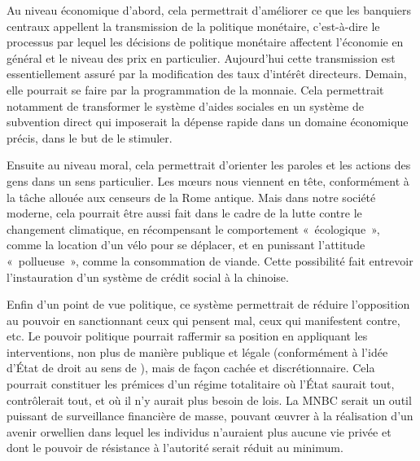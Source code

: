 Au niveau économique d'abord, cela permettrait d'améliorer ce que les banquiers centraux appellent la transmission de la politique monétaire, c'est-à-dire le processus par lequel les décisions de politique monétaire affectent l'économie en général et le niveau des prix en particulier. Aujourd'hui cette transmission est essentiellement assuré par la modification des taux d'intérêt directeurs. Demain, elle pourrait se faire par la programmation de la monnaie. Cela permettrait notamment de transformer le système d'aides sociales en un système de subvention direct qui imposerait la dépense rapide dans un domaine économique précis, dans le but de le stimuler.

Ensuite au niveau moral, cela permettrait d'orienter les paroles et les actions des gens dans un sens particulier. Les mœurs nous viennent en tête, conformément à la tâche allouée aux censeurs de la Rome antique. Mais dans notre société moderne, cela pourrait être aussi fait dans le cadre de la lutte contre le changement climatique, en récompensant le comportement «~écologique~», comme la location d'un vélo pour se déplacer, et en punissant l'attitude «~pollueuse~», comme la consommation de viande. Cette possibilité fait entrevoir l'instauration d'un système de crédit social à la chinoise.

Enfin d'un point de vue politique, ce système permettrait de réduire l'opposition au pouvoir en sanctionnant ceux qui pensent mal, ceux qui manifestent contre, etc. Le pouvoir politique pourrait raffermir sa position en appliquant les interventions, non plus de manière publique et légale (conformément à l'idée d'État de droit au sens de ), mais de façon cachée et discrétionnaire. Cela pourrait constituer les prémices d'un régime totalitaire où l'État saurait tout, contrôlerait tout, et où il n'y aurait plus besoin de lois. La MNBC serait un outil puissant de surveillance financière de masse, pouvant œuvrer à la réalisation d'un avenir orwellien dans lequel les individus n'auraient plus aucune vie privée et dont le pouvoir de résistance à l'autorité serait réduit au minimum.

